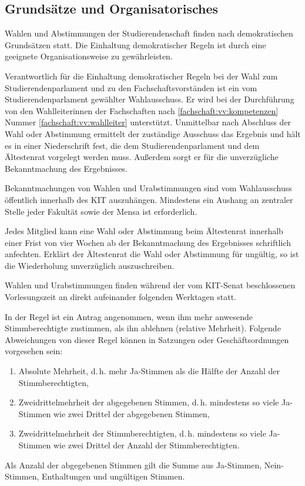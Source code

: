 \begin{contract}
%
%

\parnumberfalse \section{Grundsätze und Organisatorisches} \parnumbertrue

\label{grundsaetze:wahlen}

Wahlen und Abstimmungen der Studierendenschaft finden nach demokratischen Grundsätzen statt. Die Einhaltung demokratischer Regeln ist durch eine geeignete Organisationsweise zu gewährleisten.

Verantwortlich für die Einhaltung demokratischer Regeln bei der Wahl zum Studierendenparlament und zu den Fachschaftsvorständen ist ein vom Studierendenparlament gewählter Wahlausschuss. Er wird bei der Durchführung von den Wahlleiterinnen der Fachschaften nach \ref{fachschaft:vv:kompetenzen} Nummer \ref{fachschaft:vv:wahlleiter} unterstützt. Unmittelbar nach Abschluss der Wahl oder Abstimmung ermittelt der zuständige Ausschuss das Ergebnis und hält es in einer Niederschrift fest, die dem Studierendenparlament und dem Ältestenrat vorgelegt werden muss. Außerdem sorgt er für die unverzügliche Bekanntmachung des Ergebnisses. \label{grundsaetze:wahlen:wahlausschuss}

Bekanntmachungen von Wahlen und Urabstimmungen sind vom Wahlausschuss öffentlich innerhalb des KIT auszuhängen. Mindestens ein Aushang an zentraler Stelle jeder Fakultät sowie der Mensa ist erforderlich. \label{grundsaetze:wahlen:bekanntmachung}

Jedes Mitglied kann eine Wahl oder Abstimmung beim Ältestenrat innerhalb einer Frist von vier Wochen ab der Bekanntmachung des Ergebnisses schriftlich anfechten. Erklärt der Ältestenrat die Wahl oder Abstimmung für ungültig, so ist die Wiederholung unverzüglich auszuschreiben. \label{grundsaetze:wahlen:wahlanfechtung}

Wahlen und Urabstimmungen finden während der vom KIT-Senat beschlossenen Vorlesungszeit an direkt aufeinander folgenden Werktagen statt.

\parnumberfalse In der Regel ist ein Antrag angenommen, wenn ihm mehr anwesende Stimmberechtigte zustimmen, als ihn ablehnen (relative Mehrheit). Folgende Abweichungen von dieser Regel können in Satzungen oder Geschäftsordnungen vorgesehen sein:
\begin{enumerate}
\item Absolute Mehrheit, d.\,h. mehr Ja-Stimmen als die Hälfte der Anzahl der Stimmberechtigten,
\item Zweidrittelmehrheit der abgegebenen Stimmen, d.\,h. mindestens so viele Ja-Stimmen wie zwei Drittel der abgegebenen Stimmen,
\item Zweidrittelmehrheit der Stimmberechtigten, d.\,h. mindestens so viele Ja-Stimmen wie zwei Drittel der Anzahl der Stimmberechtigten.
\end{enumerate}
Als Anzahl der abgegebenen Stimmen gilt die Summe aus Ja-Stimmen, Nein-Stimmen, Enthaltungen und ungültigen Stimmen.\parnumbertrue



\end{contract}
